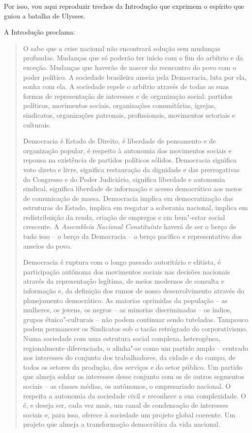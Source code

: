 Por isso, vou aqui reproduzir trechos da Introdução que exprimem o
espírito que guiou a batalha de Ulysses.

A Introdução proclama: 

\begin{quote}
O  sabe que a crise nacional não encontrará solução sem
mudanças profundas. Mudanças que só poderão ter início com o fim do
arbítrio e da exceção. Mudanças que haverão de nascer do reencontro do
povo com o poder político. A sociedade brasileira anseia pela Democracia, luta por ela, sonha com
ela. A sociedade repele o arbítrio através de todas as suas formas de
representação de interesses e de organização social: partidos políticos,
movimentos sociais, organizações comunitárias, igrejas, sindicatos,
organizações patronais, profissionais, movimentos setoriais e culturais.

Democracia é Estado de Direito, é liberdade de pensamento e de
organização popular, é respeito à autonomia dos movimentos sociais e
repousa na existência de partidos políticos sólidos. Democracia
significa voto direto e livre, significa restauração da dignidade e das
prerrogativas do Congresso e do Poder Judiciário, significa liberdade e
autonomia sindical, significa liberdade de informação e acesso
democrático aos meios de comunicação de massa. Democracia implica em
democratização das estruturas do Estado, implica em resgatar a soberania
nacional, implica em redistribuição da renda, criação de empregos e em
bem"-estar social crescente. A \emph{Assembleia Nacional
Constituinte} haverá de ser o berço de tudo
isso -- o berço da Democracia -- o berço pacífico e representativo dos
anseios do povo.

Democracia é ruptura com o longo passado autoritário e
elitista, é participação autônoma dos movimentos sociais nas decisões
nacionais através da representação legítima, de meios modernos de
consulta e informação e, da definição dos rumos de nosso desenvolvimento
através do planejamento democrático. As maiorias oprimidas da população -- as mulheres, os jovens, os negros
-- as minorias discriminadas -- os índios, grupos étnico"-culturais
-- não podem continuar sendo tuteladas.
Tampouco podem permanecer os Sindicatos sob o tacão retrógrado do
corporativismo. Numa sociedade com uma estrutura social complexa,
heterogênea, regionalmente diferenciada, o  alinha"-se como um
partido amplo -- centrado nos interesses do conjunto dos trabalhadores,
da cidade e do campo, de todos os setores da produção, dos serviços e do
setor público. Um partido que almeja soldar os interesses desse conjunto com os de
outros segmentos sociais -- as classes médias, os autônomos, o
empresariado nacional. O  respeita a autonomia da sociedade civil e
reconhece a sua complexidade. O  é, e deseja ser, cada vez mais, um
canal de condensação de interesses sociais e, para isso, oferece à
sociedade um projeto global coerente. Um projeto que almeja a
transformação democrática da vida nacional.


\end{quote}
